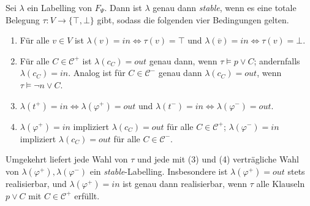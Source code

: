 \begin{Lemma}[Strukturlemma]
    \label{lem:bip-struktur}
    Sei \(\lambda\) ein Labelling von \(F_\Psi\). Dann ist \(\lambda\) genau
    dann \textit{stable}, wenn es eine totale Belegung \(\tau:V\to\{\top,\bot\}\)
    gibt, sodass die folgenden vier Bedingungen gelten.
    \begin{enumerate}
        \item Für alle \(v\in V\) ist
        \(\lambda(v)=\mathit{in}\iff\tau(v)=\top\)
        und
        \(\lambda(\overline{v})=\mathit{in}\iff\tau(v)=\bot\).
        \item Für alle \(C\in\mathcal{C}^{+}\) ist
        \(\lambda(c_C)=\mathit{out}\) genau dann, wenn \(\tau\models p\lor C\);
        andernfalls \(\lambda(c_C)=\mathit{in}\). Analog ist für
        \(C\in\mathcal{C}^{-}\) genau dann \(\lambda(c_C)=\mathit{out}\), wenn
        \(\tau\models\neg n\lor C\).
        \item \(\lambda(t^{+})=\mathit{in}\iff\lambda(\varphi^{+})=\mathit{out}\)
        und \(\lambda(t^{-})=\mathit{in}\iff\lambda(\varphi^{-})=\mathit{out}\).
        \item \(\lambda(\varphi^{+})=\mathit{in}\) impliziert
        \(\lambda(c_C)=\mathit{out}\) für alle \(C\in\mathcal{C}^{+}\);
        \(\lambda(\varphi^{-})=\mathit{in}\) impliziert
        \(\lambda(c_C)=\mathit{out}\) für alle \(C\in\mathcal{C}^{-}\).
    \end{enumerate}
    Umgekehrt liefert jede Wahl von \(\tau\) und jede mit (3) und (4)
    verträgliche Wahl von \(\lambda(\varphi^{+}),\lambda(\varphi^{-})\)
    ein \textit{stable}-Labelling. Insbesondere ist
    \(\lambda(\varphi^{+})=\mathit{out}\) stets realisierbar, und
    \(\lambda(\varphi^{+})=\mathit{in}\) ist genau dann realisierbar, wenn
    \(\tau\) alle Klauseln \(p\lor C\) mit \(C\in\mathcal{C}^{+}\) erfüllt.
\end{Lemma}

